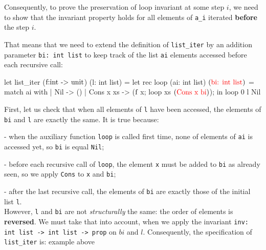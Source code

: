 \documentclass[a4paper,11pt,oneside]{article}
\theoremstyle{plain}
\begin{document}
Consequently, to prove the preservation of loop invariant at some step $i$, we need to show that the invariant property holds for all elements of \texttt{a\_i} iterated \textbf{before} the step $i$.

That means that we need to extend the definition of \texttt{list\_iter} by an addition parameter \texttt{bi: int list} to keep track of the list \texttt{ai} elements accessed before each recursive call: 

\begin{small}
	\begin{minipage}[t]{0.4\linewidth}	
	\begin{whycode}  
let list_iter  ($\textcolor{black}{\text{f:int -> unit}}$) (l: int list)
 = let rec loop (ai: int list) $(\textcolor{red}{\text{bi: int list}})$ = 
      match ai with 
       | Nil       -> ()
       | Cons x xs -> ($\textcolor{black}{\text{f}}$ x; loop xs $(\textcolor{red}{\text{Cons x bi}})$); 
   in loop 0 l Nil
 	\end{whycode}
 	\end{minipage}
 \end{small}	 
 
 First, let us check that when all elements of \texttt{l} have been accessed, the elements of \texttt{bi} and  \texttt{l} are exactly the same. It is true because:
 
	- when the auxiliary function \texttt{loop} is called first time, none of elements of \texttt{ai} is accessed yet, so \texttt{bi} is equal \texttt{Nil}; 
	
	- before each recursive call of \texttt{loop}, the element \texttt{x}  must be added to \texttt{bi} as already seen, so we apply \texttt{Cons} to \texttt{x} and \texttt{bi}; 
	
	- after the last recursive call, the elements of \texttt{bi} are  exactly those of the initial list \texttt{l}. \\

However, \texttt{l} and \texttt{bi} are not \textit{structurally} the same: the order of elements is \textbf{reversed}. We must take that into account, when we apply the invariant \texttt{inv: int list -> int list -> prop} on $bi$ and $l$. Consequently, the specification of \texttt{list\_iter} is: 
\hypertarget{list-iter}{example above}
\end{document}
